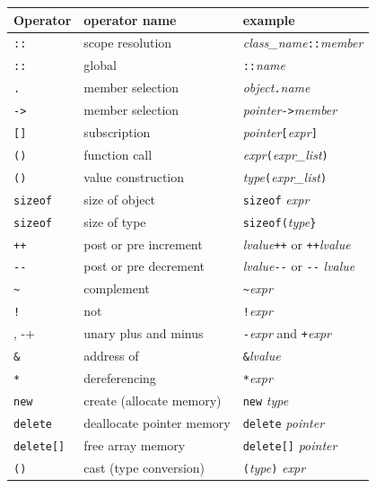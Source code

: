 \begin{table}[hbt]
 \begin{center}
 \begin{footnotesize}
  \begin{tabular}{|lll|}
    \hline
    Operator & operator name & example \\
    \hline \hline
    \verb+::+ & scope resolution & {\it class\_name}\verb+::+{\it member} \\
    \verb+::+ & global           & \verb+::+{\it name} \\
    \hline
    \verb+.+  & member selection & {\it object}\verb+.+{\it name} \\
    \verb+->+ & member selection & {\it pointer}\verb+->+{\it member} \\
    \verb+[]+ & subscription     & {\it pointer}\verb+[+{\it expr}\verb+]+ \\
    \verb+()+ & function call    & {\it expr}\verb+(+{\it expr\_list}\verb+)+ \\
    \verb+()+ & value construction & {\it type}\verb+(+{\it expr\_list}\verb+)+ \\
    \verb+sizeof+ & size of object & \verb+sizeof+ {\it expr} \\
    \verb+sizeof+ & size of type   & \verb+sizeof(+{\it type}\verb+}+ \\
    \hline
    \verb&++& & post or pre increment     & {\it lvalue}\verb&++& or \verb&++&{\it lvalue} \\
    \verb+--+ & post or pre decrement     & {\it lvalue}\verb+--+ or \verb+--+ {\it lvalue} \\
    \verb+~+  & complement         & \verb+~+{\it expr} \\
    \verb+!+  & not                & \verb+!+{\it expr} \\
    \verb++ , -+  & unary plus and minus  & \verb+-+{\it expr} and \verb&+&{\it expr} \\
    \verb+&+  & address of         & \verb+&+{\it lvalue} \\
    \verb+*+  & dereferencing      & \verb+*+{\it expr} \\
    \verb+new+ & create (allocate memory) & \verb+new+ {\it type} \\
    \verb+delete+ & deallocate pointer memory  & \verb+delete+ {\it pointer} \\
    \verb+delete[]+ & free array memory & \verb+delete[]+ {\it pointer} \\
    \verb+()+ & cast (type conversion) & \verb+(+{\it type}\verb+)+ {\it expr} \\

\end{tabular}
\end{footnotesize}
\end{center}
\end{table}
